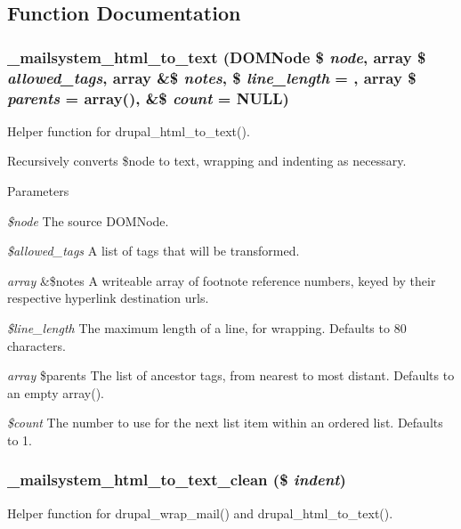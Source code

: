 \subsection{Function Documentation}
\hypertarget{html__to__text_8inc_af581a74a8de0f0cbedc673623bccdc5d}{
\subsubsection[{\_\-mailsystem\_\-html\_\-to\_\-text}]{\setlength{\rightskip}{0pt plus 5cm}\_\-mailsystem\_\-html\_\-to\_\-text (DOMNode \$ {\em node}, \/  array \$ {\em allowed\_\-tags}, \/  array \&\$ {\em notes}, \/  \$ {\em line\_\-length} = {}, \/  array \$ {\em parents} = {\ttfamily array()}, \/  \&\$ {\em count} = {\ttfamily NULL})}}
\label{html__to__text_8inc_af581a74a8de0f0cbedc673623bccdc5d}
Helper function for drupal\_\-html\_\-to\_\-text().

Recursively converts \$node to text, wrapping and indenting as necessary.


\begin{DoxyParams}{Parameters}
\item[{\em \$node}]The source DOMNode. \item[{\em \$allowed\_\-tags}]A list of tags that will be transformed. \item[{\em array}]\&\$notes A writeable array of footnote reference numbers, keyed by their respective hyperlink destination urls. \item[{\em \$line\_\-length}]The maximum length of a line, for wrapping. Defaults to 80 characters. \item[{\em array}]\$parents The list of ancestor tags, from nearest to most distant. Defaults to an empty array(). \item[{\em \$count}]The number to use for the next list item within an ordered list. Defaults to 1. \end{DoxyParams}
\hypertarget{html__to__text_8inc_a33422aa7297978d57f41144ae705ed60}{
\subsubsection[{\_\-mailsystem\_\-html\_\-to\_\-text\_\-clean}]{\setlength{\rightskip}{0pt plus 5cm}\_\-mailsystem\_\-html\_\-to\_\-text\_\-clean (\$ {\em indent})}}
\label{html__to__text_8inc_a33422aa7297978d57f41144ae705ed60}
Helper function for drupal\_\-wrap\_\-mail() and drupal\_\-html\_\-to\_\-text().

